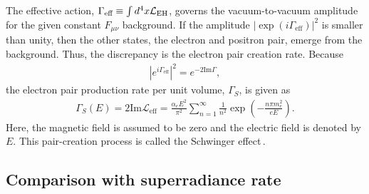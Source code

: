 \documentclass[%
 preprint,
 nofootinbib,
 amsmath,amssymb,
 aps,
 a4paper
]{revtex4-1}
\begin{document}
The effective action, $\Gamma_\text{eff} \equiv \int d^4x \mathcal{L}_{\rm EH}$, governs the vacuum-to-vacuum amplitude for the given constant $F_{\mu\nu}$ background. If the amplitude $\left|\exp(i\Gamma_{\text{eff}})\right|^2$ is smaller than unity, then the other states, the electron and positron pair, emerge from the background. Thus, the discrepancy is the electron pair creation rate.
Because
\begin{align}
    \left|e^{i\Gamma_{\text{eff}}}\right|^2 = e^{-2 \text{Im}\Gamma},
\end{align}
the electron pair production rate per unit volume, $\Gamma_S$, is given as
\begin{eqnarray}
\label{eq:Schwinger_rate}
\Gamma_S(E) = 2 \text{Im}\mathcal{L}_\text{eff} = \frac{\alpha_e E^2}{\pi^2}\sum_{n = 1}^\infty \frac{1}{n^2}\exp\left(-\frac{n\pi m_e^2}{e E}\right).
\end{eqnarray}
Here, the magnetic field is assumed to be zero and the electric field is denoted by $E$. This pair-creation process is called the Schwinger effect\,\cite{Schwinger:1951nm}.


\subsection{Comparison with superradiance rate} 
\end{document}
